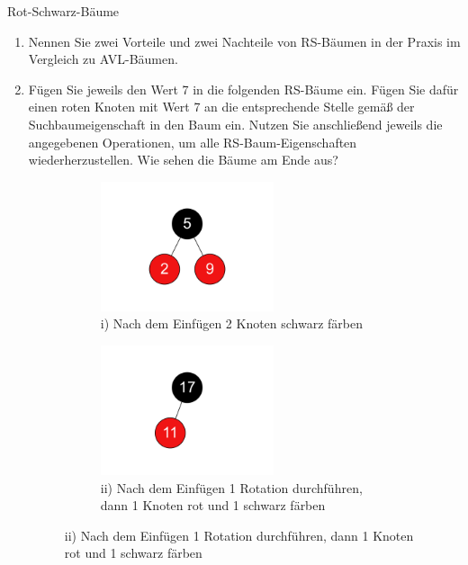 \documentclass[11pt,a4paper]{article}
\begin{document}
\begin{aufgabe}{2}{Rot-Schwarz-Bäume}
    \begin{enumerate}
        \item
        Nennen Sie zwei Vorteile und zwei Nachteile von RS-Bäumen in der Praxis im Vergleich zu AVL-Bäumen.

        \item Fügen Sie jeweils den Wert 7 in die folgenden RS-Bäume ein.
        Fügen Sie dafür einen roten Knoten mit Wert 7 an die entsprechende Stelle gemäß der Suchbaumeigenschaft in den Baum ein.
        Nutzen Sie anschließend jeweils die angegebenen Operationen, um alle RS-Baum-Eigenschaften wiederherzustellen.
        Wie sehen die Bäume am Ende aus?

        \begin{figure}[h!]
            \centering
            \begin{subfigure}[t]{0.28\textwidth}
                \centering
                \includegraphics[width=0.6\textwidth]{img/2a_1}
                \caption*{i) Nach dem Einfügen 2 Knoten schwarz färben}
            \end{subfigure}
            \begin{subfigure}[t]{0.28\textwidth}
                \centering
                \includegraphics[width=0.6\textwidth]{img/2a_2}
                \caption*{ii) Nach dem Einfügen 1 Rotation durchführen, dann 1 Knoten rot und 1 schwarz färben}

\end{subfigure}
\end{figure}
\end{enumerate}
\end{aufgabe}
\end{document}
